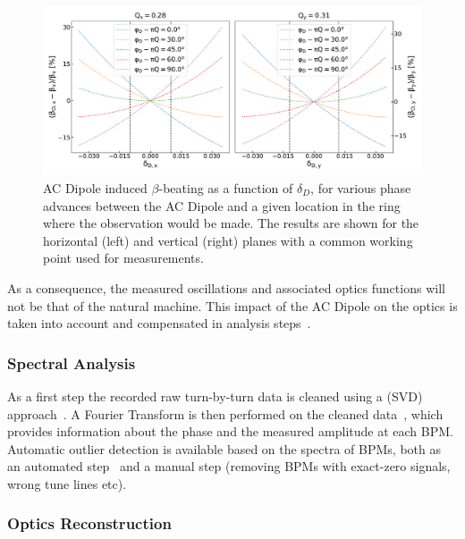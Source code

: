 \begin{figure}[!htb]
  \centering
  \includegraphics*[width=0.99\linewidth]{Figures/Optics_Measurements_Corrections_at_LHC/bbeatings_acdipole.pdf}
  \caption{AC Dipole induced \(\beta\)-beating as a function of \(\delta_D\), for various phase advances between the AC Dipole and a given location in the ring where the observation would be made. The results are shown for the horizontal (left) and vertical (right) planes with a common working point used for measurements.}
  \label{figure:ac_dipole_induced_beta_beating}
\end{figure}

As a consequence, the measured oscillations and associated optics functions will not be that of the natural machine.
This impact of the AC Dipole on the optics is taken into account and compensated in analysis steps~\cite{IPAC:Miyamoto:Measurement_Coupling_RDTs_LHC_AC_Dipole}.

\subsubsection*{Spectral Analysis}

As a first step the recorded raw turn-by-turn data is cleaned using a  (SVD) approach~\cite{PRAB:Calaga:Statistical_Analysis_RHIC_BPMs}.
A Fourier Transform is then performed on the cleaned data~\cite{PHD:Malina,IPAC:Malina:Harpy_Fast_Simple}, which provides information about the phase and the measured amplitude at each BPM.
Automatic outlier detection is available based on the spectra of BPMs, both as an automated step~\cite{PRAB:Fol:Detection_Faulty_BPMs} and a manual step (removing BPMs with exact-zero signals, wrong tune lines etc).

\subsubsection*{Optics Reconstruction}

